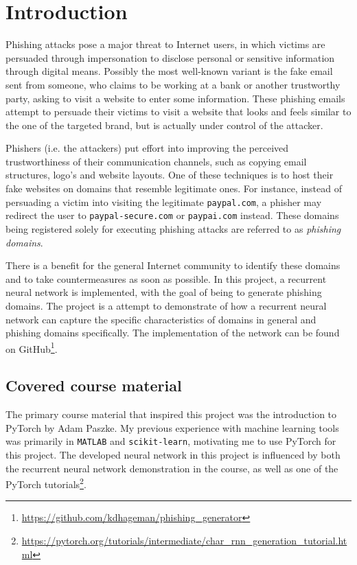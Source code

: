 \section{Introduction}
Phishing attacks pose a major threat to Internet users, in which victims are persuaded through impersonation to disclose personal or sensitive information through digital means.
Possibly the most well-known variant is the fake email sent from someone, who claims to be working at a bank or another trustworthy party, asking to visit a website to enter some information.
These phishing emails attempt to persuade their victims to visit a website that looks and feels similar to the one of the targeted brand, but is actually under control of the attacker.

Phishers (i.e. the attackers) put effort into improving the perceived trustworthiness of their communication channels, such as copying email structures, logo's and website layouts.
One of these techniques is to host their fake websites on domains that resemble legitimate ones.
For instance, instead of persuading a victim into visiting the legitimate {\tt paypal.com}, a phisher may redirect the user to {\tt paypal-secure.com} or {\tt paypai.com} instead.
These domains being registered solely for executing phishing attacks are referred to as {\it phishing domains}.

There is a benefit for the general Internet community to identify these domains and to take countermeasures as soon as possible.
In this project, a recurrent neural network is implemented, with the goal of being to generate phishing domains.
The project is a attempt to demonstrate of how a recurrent neural network can capture the specific characteristics of domains in general and phishing domains specifically. 
The implementation of the network can be found on GitHub\footnote{\url{https://github.com/kdhageman/phishing_generator}}.


\subsection{Covered course material}
The primary course material that inspired this project was the introduction to PyTorch by Adam Paszke.
My previous experience with machine learning tools was primarily in {\tt MATLAB} and {\tt scikit-learn}, motivating me to use PyTorch for this project.
The developed neural network in this project is influenced by both the recurrent neural network demonstration in the course, as well as one of the PyTorch tutorials\footnote{\url{https://pytorch.org/tutorials/intermediate/char_rnn_generation_tutorial.html}}.